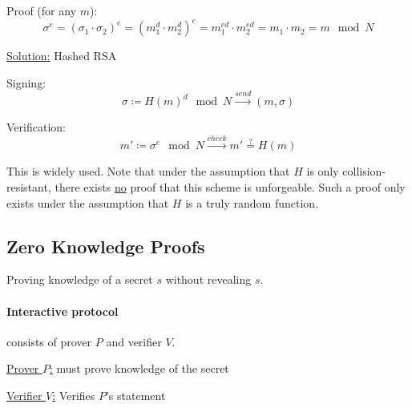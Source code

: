 Proof (for any $m$): $$ \sigma ^e = (\sigma_1 \cdot \sigma_2)^e = (m_1^d \cdot m_2^d)^e = m_1^{ed} \cdot m_2^{ed} = m_1 \cdot m_2 = m \mod N $$

\underline{Solution:} Hashed RSA

Signing: $$ \sigma \coloneqq H(m)^d \mod N \xrightarrow{send} (m, \sigma) $$

Verification: $$ m' \coloneqq \sigma^e \mod N \xrightarrow{check} m' \stackrel{?}{=} H(m) $$

This is widely used. Note that under the assumption that $H$ is only collision-resistant, there exists \underline{no} proof that this scheme is unforgeable. Such a proof only exists under the assumption that $H$ is a truly random function.


\pagebreak
\subsection{Zero Knowledge Proofs}

Proving knowledge of a secret $s$ without revealing $s$. 

\paragraph{Interactive protocol} consists of prover $P$ and verifier $V$.

\underline{Prover $P$:} must prove knowledge of the secret

\underline{Verifier $V$:} Verifies $P$'s statement

